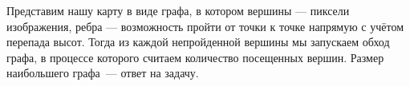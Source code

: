 \solutionSection

Представим нашу карту в виде графа, в котором вершины — пиксели изображения, ребра — возможность пройти от точки к точке напрямую с учётом перепада высот. Тогда из каждой непройденной вершины мы запускаем обход графа, в процессе которого считаем количество посещенных вершин. Размер наибольшего графа~— ответ на задачу. 

\codeExample

